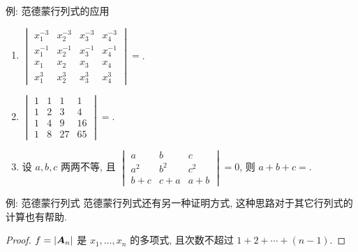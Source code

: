 \begin{frame}{例: 范德蒙行列式的应用}
	\onslide<+->
	\begin{exercise}
		\begin{enumerate}
			\item $\begin{vmatrix}
				x_1^{-3}&x_2^{-3}&x_3^{-3}&x_4^{-3}\\
				x_1^{-1}&x_2^{-1}&x_3^{-1}&x_4^{-1}\\
				x_1&x_2&x_3&x_4\\
				x_1^{3}&x_2^{3}&x_3^{3}&x_4^{3}
			\end{vmatrix}=$.
			\item $\begin{vmatrix}
				1&1&1&1\\
				1&2&3&4\\
				1&4&9&16\\
				1&8&27&65
			\end{vmatrix}=$.
			\item 设 $a,b,c$ 两两不等, 且 $\begin{vmatrix}
				a&b&c\\
				a^2&b^2&c^2\\
				b+c&c+a&a+b
			\end{vmatrix}=0$, 则 $a+b+c=$.
		\end{enumerate}
	\end{exercise}
\end{frame}


\begin{frame}{例: 范德蒙行列式\noexer}
	\onslide<+->
	范德蒙行列式还有另一种证明方式, 这种思路对于其它行列式的计算也有帮助.
	\begin{proof}
		$f=|{\boldsymbol{A}}_n|$ 是 $x_1,\dots,x_n$ 的多项式, 且次数不超过 $1+2+\cdots+(n-1)$.
		\onslide<+->{%
			因此 $g=1$.\qedhere
		}
	\end{proof}
\end{frame}


